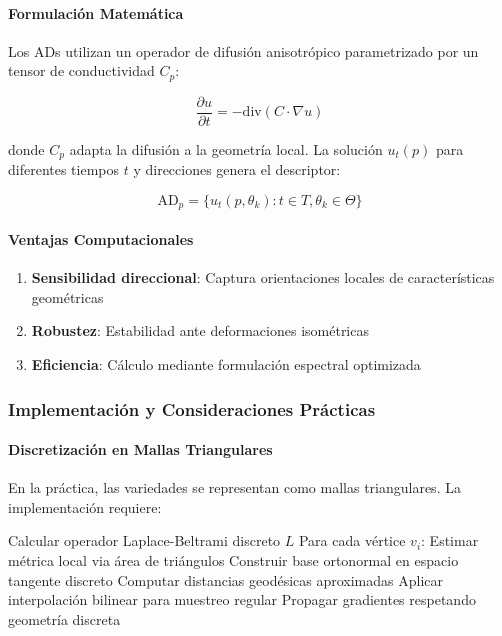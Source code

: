\paragraph{Formulación Matemática}

Los ADs utilizan un operador de difusión anisotrópico parametrizado por un tensor de conductividad $C_p$:

\begin{equation}
\frac{\partial u}{\partial t} = -\text{div}(C \cdot \nabla u)
\end{equation}

donde $C_p$ adapta la difusión a la geometría local. La solución $u_t(p)$ para diferentes tiempos $t$ y direcciones genera el descriptor:

\begin{equation}
\text{AD}_p = \{u_t(p, \theta_k) : t \in T, \theta_k \in \Theta\}
\end{equation}

\paragraph{Ventajas Computacionales}

\begin{enumerate}
    \item \textbf{Sensibilidad direccional}: Captura orientaciones locales de características geométricas
    \item \textbf{Robustez}: Estabilidad ante deformaciones isométricas
    \item \textbf{Eficiencia}: Cálculo mediante formulación espectral optimizada
\end{enumerate}

\subsubsection{Implementación y Consideraciones Prácticas}

\paragraph{Discretización en Mallas Triangulares}

En la práctica, las variedades se representan como mallas triangulares. La implementación requiere:

\begin{algorithm}[H]
\caption{Geodesic CNN en Malla Triangular}
\begin{algorithmic}[1]
    \State Calcular operador Laplace-Beltrami discreto $L$
    \State Para cada vértice $v_i$:
    \State \quad Estimar métrica local via área de triángulos
    \State \quad Construir base ortonormal en espacio tangente discreto
    \State \quad Computar distancias geodésicas aproximadas
    \State \quad Aplicar interpolación bilinear para muestreo regular
    \State Propagar gradientes respetando geometría discreta
\end{algorithmic}
\end{algorithm}


